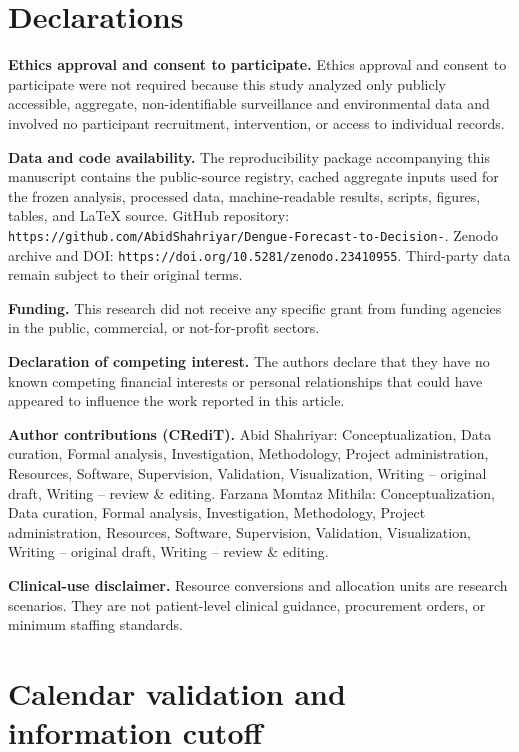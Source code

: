\documentclass[11pt]{article}
\begin{document}
\section*{Declarations}

\textbf{Ethics approval and consent to participate.} Ethics approval and consent to participate were not required because this study analyzed only publicly accessible, aggregate, non-identifiable surveillance and environmental data and involved no participant recruitment, intervention, or access to individual records.

\textbf{Data and code availability.} The reproducibility package accompanying this manuscript contains the public-source registry, cached aggregate inputs used for the frozen analysis, processed data, machine-readable results, scripts, figures, tables, and LaTeX source. GitHub repository: \texttt{https://github.com/AbidShahriyar/Dengue-Forecast-to-Decision-}. Zenodo archive and DOI: \texttt{https://doi.org/10.5281/zenodo.23410955}. Third-party data remain subject to their original terms.

\textbf{Funding.} This research did not receive any specific grant from funding agencies in the public, commercial, or not-for-profit sectors.

\textbf{Declaration of competing interest.} The authors declare that they have no known competing financial interests or personal relationships that could have appeared to influence the work reported in this article.

\textbf{Author contributions (CRediT).} Abid Shahriyar: Conceptualization, Data curation, Formal analysis, Investigation, Methodology, Project administration, Resources, Software, Supervision, Validation, Visualization, Writing -- original draft, Writing -- review \& editing. Farzana Momtaz Mithila: Conceptualization, Data curation, Formal analysis, Investigation, Methodology, Project administration, Resources, Software, Supervision, Validation, Visualization, Writing -- original draft, Writing -- review \& editing.

\textbf{Clinical-use disclaimer.} Resource conversions and allocation units are research scenarios. They are not patient-level clinical guidance, procurement orders, or minimum staffing standards.

\appendix
{}

\section{Calendar validation and information cutoff}
\end{document}
